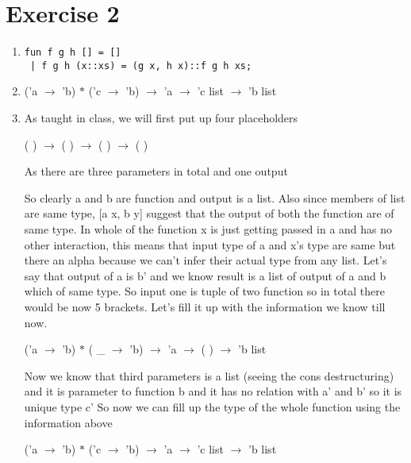\documentclass[12pt]{article}
\begin{document}
\newpage

\section*{Exercise 2}

\begin{enumerate}[label=(\alph*)]

\item 
\begin{verbatim}
fun f g h [] = []
 | f g h (x::xs) = (g x, h x)::f g h xs;
\end{verbatim}

\item ('a $\rightarrow$ 'b) $\ast$ ('c $\rightarrow$ 'b) $\rightarrow$ 'a $\rightarrow$ 'c list $\rightarrow$ 'b list

\item As taught in class, we will first put up four placeholders

( ) $\rightarrow$ ( ) $\rightarrow$ ( )  $\rightarrow$ ( )

As there are three parameters in total and one output

So clearly a and b are function and output is a list. Also since members of list are same type, [a x, b y] suggest that the output of both the function are of same type. In whole of the function x is just getting passed in a and has no other interaction, this means that input type of a and x's type are same but there an alpha because we can't infer their actual type from any list. Let's say that output of a is b' and we know result is a list of output of a and b which of same type. So input one is tuple of two function so in total there would be now 5 brackets. Let's fill it up with the information we know till now.

('a $\rightarrow$ 'b) $\ast$ ( \_ $\rightarrow$ 'b) $\rightarrow$ 'a $\rightarrow$ ( ) $\rightarrow$ 'b list

Now we know that third parameters is a list (seeing the cons destructuring) and it is parameter to function b and it has no relation with a' and b' so it is unique type c' So now we can fill up the type of the whole function using the information above


('a $\rightarrow$ 'b) $\ast$ ('c $\rightarrow$ 'b) $\rightarrow$ 'a $\rightarrow$ 'c list $\rightarrow$ 'b list

\newpage 

\end{enumerate}
\end{document}
